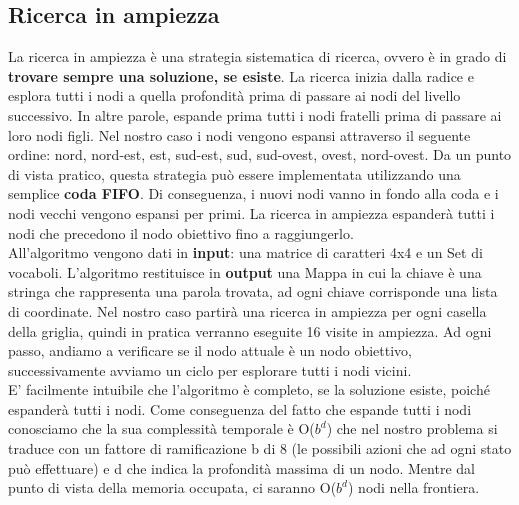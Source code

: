 \documentclass[10pt,a4paper]{article}
\begin{document}
	\subsection{Ricerca in ampiezza}
	La ricerca in ampiezza è una strategia sistematica di ricerca, ovvero è in grado di \textbf{trovare	sempre una soluzione, se esiste}. La ricerca inizia dalla radice e esplora tutti i nodi a quella profondità prima di passare ai nodi del livello successivo. In altre parole, espande prima tutti i nodi fratelli prima di passare ai loro nodi figli. Nel nostro caso i nodi vengono espansi attraverso il seguente ordine: nord, nord-est, est, sud-est, sud, sud-ovest, ovest, nord-ovest.
	Da un punto di vista pratico, questa strategia può essere implementata utilizzando una semplice \textbf{coda FIFO}. Di conseguenza, i nuovi nodi vanno in fondo alla coda e i nodi vecchi vengono espansi per primi. La ricerca in ampiezza espanderà tutti i nodi che precedono il nodo obiettivo fino a raggiungerlo.\\
	All'algoritmo vengono dati in \textbf{input}: una matrice di caratteri 4x4 e un Set di vocaboli. L'algoritmo restituisce in \textbf{output} una Mappa in cui la chiave è una stringa che rappresenta una parola trovata, ad ogni chiave corrisponde una lista di coordinate.
	Nel nostro caso partirà una ricerca in ampiezza per ogni casella della griglia, quindi in pratica verranno eseguite 16 visite in ampiezza.
	Ad ogni passo, andiamo a verificare se il nodo attuale è un nodo obiettivo, successivamente avviamo un ciclo per esplorare tutti i nodi vicini.\\
	E’ facilmente intuibile che l’algoritmo è completo, se la soluzione esiste, poiché espanderà tutti i nodi.
	Come conseguenza del fatto che espande tutti i nodi conosciamo che la sua complessità temporale è O($b^d$) che nel nostro problema si traduce con un fattore di ramificazione b di 8 (le possibili azioni che ad ogni stato può effettuare) e d che indica la profondità massima di un nodo. Mentre dal punto di vista della memoria occupata, ci saranno O($b^d$) nodi nella frontiera.
\end{document}
